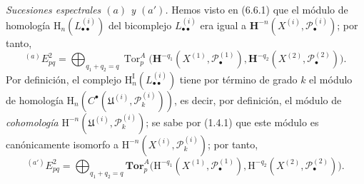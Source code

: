 \begin{env}[6.6.3]
\label{III.6.6.3}
\emph{Sucesiones espectrales $(a)$ y $(a')$.} Hemos visto en (6.6.1) que el
módulo de homología $\mathrm H_n(L_{\bullet\bullet}^{(i)})$ del bicomplejo
$L_{\bullet\bullet}^{(i)}$ era igual a
$\mathbf H^{-n}(X^{(i)},\mathscr P_\bullet^{(i)})$; por tanto,
\[
  {}^{(a)}E_{pq}^2
  =\bigoplus_{q_1+q_2=q}
   \operatorname{Tor}_p^A
   \bigl(\mathbf H^{-q_1}(X^{(1)},\mathscr P_\bullet^{(1)}),
         \mathbf H^{-q_2}(X^{(2)},\mathscr P_\bullet^{(2)})\bigr).
\]
Por definición, el complejo
$\mathrm H_n^{\mathrm I}(L_{\bullet\bullet}^{(i)})$ tiene por término de grado
$k$ el módulo de homología
$\mathrm H_n(C^\bullet(\mathfrak U^{(i)},\mathscr P_k^{(i)}))$, es decir,
por definición, el módulo de \emph{cohomología}
$\mathrm H^{-n}(\mathfrak U^{(i)},\mathscr P_k^{(i)})$; se sabe por (1.4.1)
que este módulo es canónicamente isomorfo a
$\mathrm H^{-n}(X^{(i)},\mathscr P_k^{(i)})$; por tanto,
\[
  {}^{(a')}E_{pq}^2
  =\bigoplus_{q_1+q_2=q}
   \mathbf{Tor}_p^A
   \bigl(\mathrm H^{-q_1}(X^{(1)},\mathscr P_\bullet^{(1)}),
         \mathrm H^{-q_2}(X^{(2)},\mathscr P_\bullet^{(2)})\bigr).
\]
\end{env}

